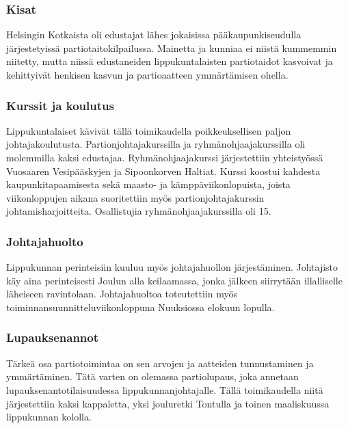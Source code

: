 \subsubsection{Kisat}
Helsingin Kotkaista oli edustajat lähes jokaisissa pääkaupunkiseudulla järjestetyissä partiotaitokilpailussa. Mainetta ja kunniaa ei niistä kummemmin niitetty, mutta niissä edustaneiden lippukuntalaisten partiotaidot kasvoivat ja kehittyivät henkisen kasvun ja partioaatteen ymmärtämisen ohella.
\subsubsection{Kurssit ja koulutus}
Lippukuntalaiset kävivät tällä toimikaudella poikkeuksellisen paljon johtajakoulutusta. Partionjohtajakurssilla ja ryhmänohjaajakurssilla oli molemmilla kaksi edustajaa. Ryhmänohjaajakurssi järjestettiin yhteistyössä Vuosaaren Vesipääskyjen ja Sipoonkorven Haltiat. Kurssi koostui kahdesta kaupunkitapaamisesta sekä maasto- ja kämppäviikonlopuista, joista viikonloppujen aikana suoritettiin myös partionjohtajakurssin johtamisharjoitteita. Osallistujia ryhmänohjaajakurssilla oli 15.
\subsubsection{Johtajahuolto}
Lippukunnan perinteisiin kuuluu myös johtajahuollon järjestäminen. Johtajisto käy aina perinteisesti Joulun alla keilaamassa, jonka jälkeen siirrytään illalliselle läheiseen ravintolaan. Johtajahuoltoa toteutettiin myös toiminnansuunnitteluviikonloppuna Nuuksiossa elokuun lopulla.
\subsubsection{Lupauksenannot}
Tärkeä osa partiotoimintaa on sen arvojen ja aatteiden tunnustaminen ja ymmärtäminen. Tätä varten on olemassa partiolupaus, joka annetaan lupauksenantotilaisuudessa lippukunnanjohtajalle. Tällä toimikaudella niitä järjestettiin kaksi kappaletta, yksi jouluretki Tontulla ja toinen maaliskuussa lippukunnan kololla.

